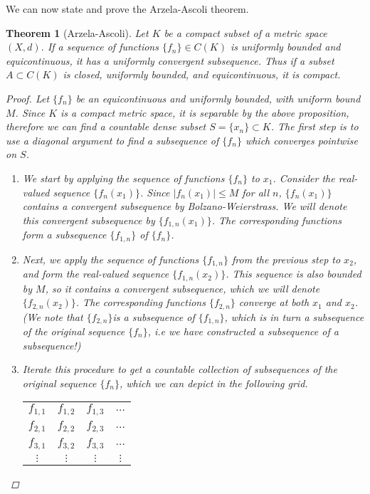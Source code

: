 \documentclass[12pt]{amsart}         %
\newtheorem{theorem}{Theorem}[section]
\theoremstyle{remark}
\begin{document}
We can now state and prove the Arzela-Ascoli theorem.

\begin{theorem}[Arzela-Ascoli] Let $K$ be a compact subset of a metric space $(X, d)$. If a sequence of functions $\{f_n\} \in C(K)$ is uniformly bounded and equicontinuous, it has a uniformly convergent subsequence. Thus if a subset $A \subset C(K)$ is closed, uniformly bounded, and equicontinuous, it is compact.
\begin{proof}
Let $\{f_n\}$ be an equicontinuous and uniformly bounded, with uniform bound $M$. Since $K$ is a compact metric space, it is separable by the above proposition, therefore we can find a countable dense subset $S = \{ x_n \} \subset K$. The first step is to use a diagonal argument to find a subsequence of $\{f_n\}$ which converges pointwise on $S$. 
\begin{enumerate}
    \item We start by applying the sequence of functions $\{f_n\}$ to $x_1$. Consider the real-valued sequence $\{ f_n(x_1) \}$. Since $|f_n(x_1)| \leq M$ for all $n$, $\{ f_n(x_1) \}$ contains a convergent subsequence by Bolzano-Weierstrass. We will denote this convergent subsequence by $\{ f_{1,n}(x_1) \}$. The corresponding functions form a subsequence $\{ f_{1,n} \}$ of $\{f_n\}$.
    \item Next, we apply the sequence of functions $\{ f_{1,n} \}$ from the previous step to $x_2$, and form the real-valued sequence $\{ f_{1,n}(x_2) \}$. This sequence is also bounded by $M$, so it contains a convergent subsequence, which we will denote $\{ f_{2,n}(x_2) \}$. The corresponding functions $\{ f_{2,n} \}$ converge at both $x_1$ and $x_2$. (We note that $\{ f_{2,n} \}$is a subsequence of $\{ f_{1,n} \}$, which is in turn a subsequence of the original sequence $\{f_n\}$, i.e we have constructed a subsequence of a subsequence!) 
    \item Iterate this procedure to get a countable collection of subsequences of the original sequence $\{f_n\}$, which we can depict in the following grid.
    \begin{table}[H]
        \centering
        \begin{tabular}{cccc}
             $f_{1,1}$ & $f_{1,2}$ & $f_{1,3}$ & $\dots$  \\
             $f_{2,1}$ & $f_{2,2}$ & $f_{2,3}$ & $\dots$  \\
             $f_{3,1}$ & $f_{3,2}$ & $f_{3,3}$ & $\dots$ \\
             $\vdots$ & $\vdots$ & $\vdots$ & $\vdots$

\end{tabular}
\end{table}
\end{enumerate}
\end{proof}
\end{theorem}
\end{document}
